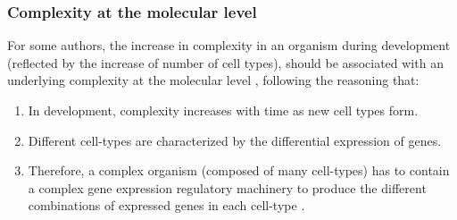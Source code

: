 \subsubsection{Complexity at the molecular level}

For some authors, the increase in complexity in an organism during development (reflected by the increase of number of cell types), should be associated with an underlying complexity at the molecular level \citep{Davidson2001,Arthur2010}, following the reasoning that:

\begin{enumerate}
\item In development, complexity increases with time as new cell types form.
\item Different cell-types are characterized by the differential expression of genes.
\item Therefore, a complex organism (composed of many cell-types) has to contain a complex gene expression regulatory machinery to produce the different combinations of expressed genes in each cell-type \citep{Davidson2001}.
\end{enumerate}
%

%

